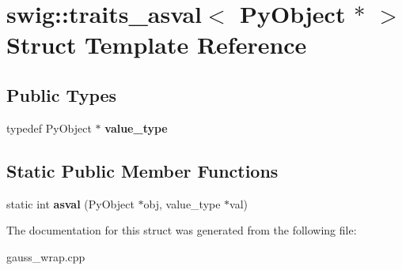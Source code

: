 \hypertarget{structswig_1_1traits__asval_3_01_py_object_01_5_01_4}{\section{swig\-:\-:traits\-\_\-asval$<$ Py\-Object $\ast$ $>$ Struct Template Reference}
\label{structswig_1_1traits__asval_3_01_py_object_01_5_01_4}
}
\subsection*{Public Types}
\begin{DoxyCompactItemize}
\item 
\hypertarget{structswig_1_1traits__asval_3_01_py_object_01_5_01_4_ad50e5d06c5ffc618c4367791ed2c0aee}{typedef Py\-Object $\ast$ {\bfseries value\-\_\-type}}\label{structswig_1_1traits__asval_3_01_py_object_01_5_01_4_ad50e5d06c5ffc618c4367791ed2c0aee}

\end{DoxyCompactItemize}
\subsection*{Static Public Member Functions}
\begin{DoxyCompactItemize}
\item 
\hypertarget{structswig_1_1traits__asval_3_01_py_object_01_5_01_4_a5343f0cbfdbd117628374a526a11fedb}{static int {\bfseries asval} (Py\-Object $\ast$obj, value\-\_\-type $\ast$val)}\label{structswig_1_1traits__asval_3_01_py_object_01_5_01_4_a5343f0cbfdbd117628374a526a11fedb}

\end{DoxyCompactItemize}


The documentation for this struct was generated from the following file\-:\begin{DoxyCompactItemize}
\item 
gauss\-\_\-wrap.\-cpp\end{DoxyCompactItemize}
